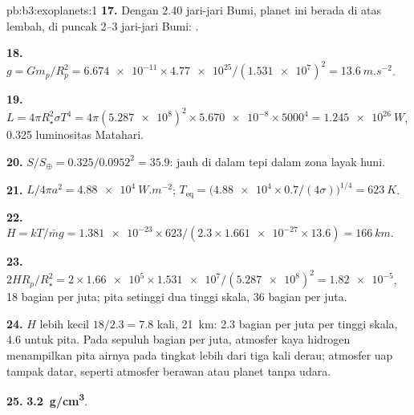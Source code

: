 \begin{solution}{pb:b3:exoplanets:1}
\textbf{17.} Dengan 2.40 jari-jari Bumi, planet ini berada di atas lembah, di
puncak 2--3 jari-jari Bumi: .

\textbf{18.} $g = Gm_p/R_p^2 = \num{6.674e-11}\times\num{4.77e25}/(\num{1.531e7})^2 =
\qty{13.6}{m.s^{-2}}$.

\textbf{19.} $L = 4\pi R_\star^2\sigma T^4 = 4\pi(\num{5.287e8})^2\times\num{5.670e-8}
\times5000^4 = \qty{1.245e26}{W}$, 0.325 luminositas Matahari.

\textbf{20.} $S/S_\oplus = 0.325/0.0952^2 = 35.9$: jauh di dalam tepi dalam
zona layak huni.

\textbf{21.} $L/4\pi a^2 = \qty{4.88e4}{W.m^{-2}}$; $T_\mathrm{eq} =
\bigl(\num{4.88e4}\times0.7/(4\sigma)\bigr)^{1/4} = \qty{623}{K}$.

\textbf{22.} $H = kT/\bar m g = \num{1.381e-23}\times623/(2.3\times\num{1.661e-27}
\times13.6) = \qty{166}{km}$.

\textbf{23.} $2HR_p/R_\star^2 = 2\times\num{1.66e5}\times\num{1.531e7}/
(\num{5.287e8})^2 = \num{1.82e-5}$, 18 bagian per juta; pita setinggi dua
tinggi skala, 36 bagian per juta.

\textbf{24.} $H$ lebih kecil $18/2.3 = 7.8$ kali, \qty{21}{km}: 2.3 bagian per
juta per tinggi skala, 4.6 untuk pita. Pada sepuluh bagian per juta, atmosfer
kaya hidrogen menampilkan pita airnya pada tingkat lebih dari tiga kali
derau; atmosfer uap tampak datar, seperti atmosfer berawan atau planet
tanpa udara.

\textbf{25.} \textbf{\qty[text-series-to-math=true]{3.2}{g/cm^3}}.
\end{solution}
